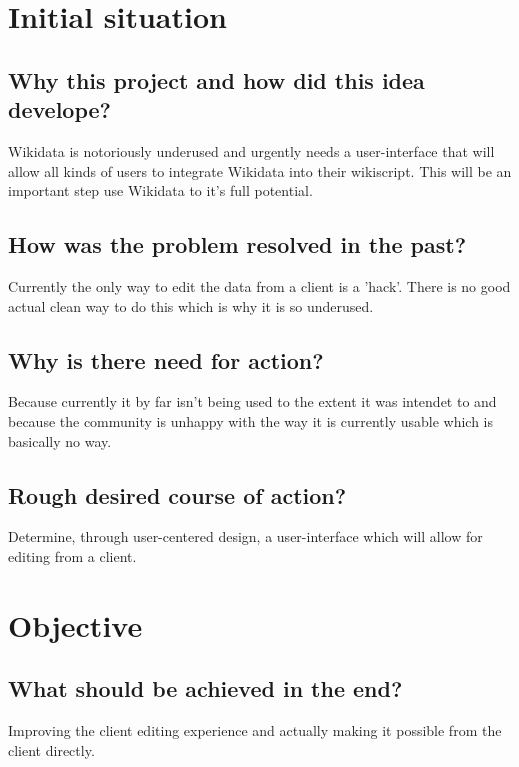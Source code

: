 \documentclass{article}
\date{10.11.2015}
\begin{document}
\section{Initial situation}

\subsection{Why this project and how did this idea develope?}

Wikidata is notoriously underused and urgently needs a user-interface that will allow all kinds of users to integrate Wikidata into their wikiscript. This will be an important step use Wikidata to it's full potential.

\subsection{How was the problem resolved in the past?}

Currently the only way to edit the data from a client is a 'hack'. There is no good actual clean way to do this which is why it is so underused. 

\subsection{Why is there need for action?}

Because currently it by far isn't being used to the extent it was intendet to and because the community is unhappy with the way it is currently usable which is basically no way.

\subsection{Rough desired course of action?}

Determine, through user-centered design, a user-interface which will allow for editing from a client. 


\section{Objective}

\subsection{What should be achieved in the end?}

Improving the client editing experience and actually making it possible from the client directly.
\end{document}
